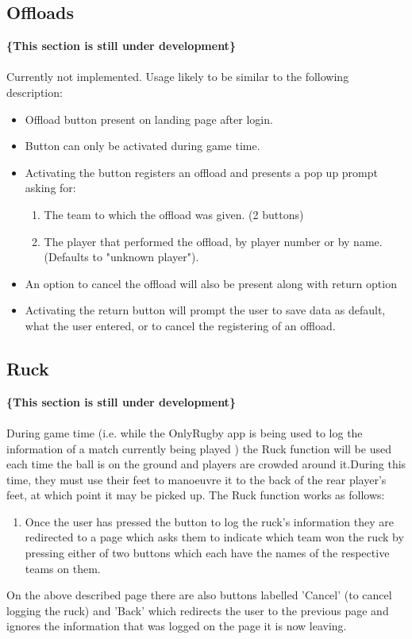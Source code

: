 \documentclass[hidelinks,a4paper,12pt]{article}
\begin{document}
	\subsection{Offloads}
	{\bfseries\{This section is still under development\}}\\ \\
	Currently not implemented. Usage likely to be similar to the following description:
	\begin{itemize}
		\item Offload button present on landing page after login.
		\item Button can only be activated during game time.
		\item Activating the button registers an offload and presents a pop up prompt asking for:
			\begin{enumerate}
				\item The team to which the offload was given. (2 buttons)
				\item The player that performed the offload, by player number or by name. (Defaults to "unknown player").
			\end{enumerate}
		\item An option to cancel the offload will also be present along with return option
		\item Activating the return button will prompt the user to save data as default, what the user entered, or to cancel the registering of an offload.
	\end{itemize}
	\subsection{Ruck}
	{\bfseries\{This section is still under development\}}\\ \\
		During game time (i.e. while the OnlyRugby app is being used to log the information of a match currently being played ) the Ruck function will be used each time the ball is on the ground and players are crowded around it.During this time, they must use their feet to manoeuvre it to the back of the rear player's feet, at which point it may be picked up. The Ruck function works as follows:
		\begin{enumerate}
			\item Once the user has pressed the button to log the ruck's information they are redirected to a page which asks them to indicate which
			team won the ruck by pressing either of two buttons which each have the names of the respective teams on them.
		\end{enumerate}
	On the above described page there are also buttons labelled 'Cancel' (to cancel logging the ruck) and 'Back' which redirects the user to the previous page and ignores the information that was logged on the page it is now leaving.
\end{document}
